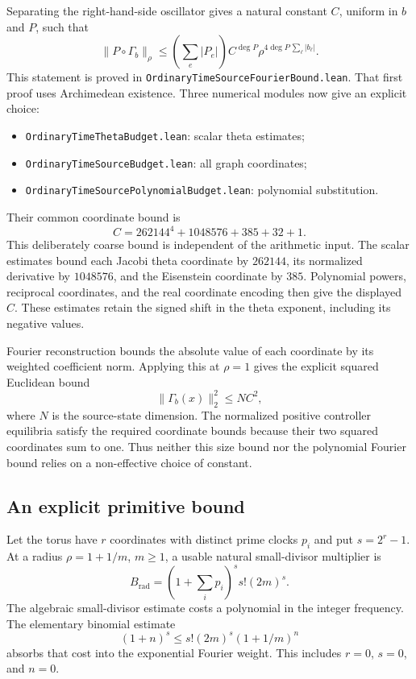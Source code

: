 \documentclass[11pt]{article}
\newcommand{\code}[1]{{\small\nolinkurl{#1}}}
\begin{document}
Separating the right-hand-side oscillator gives a natural constant $C$,
uniform in $b$ and $P$, such that
\[
 \|P\circ\Gamma_b\|_\rho
 \le \left(\sum_e |P_e|\right) C^{\deg P}
       \rho^{4\deg P\,\sum_\ell |b_\ell|}.
\]
This statement is proved in \code{OrdinaryTimeSourceFourierBound.lean}.
That first proof uses Archimedean existence. Three numerical modules now
give an explicit choice:
\begin{itemize}
\item \code{OrdinaryTimeThetaBudget.lean}: scalar theta estimates;
\item \code{OrdinaryTimeSourceBudget.lean}: all graph coordinates;
\item \code{OrdinaryTimeSourcePolynomialBudget.lean}: polynomial substitution.
\end{itemize}
Their common coordinate bound is
\[
 C=262144^4+1048576+385+32+1.
\]
This deliberately coarse bound is independent of the arithmetic input.
The scalar estimates bound each Jacobi theta coordinate by $262144$, its
normalized derivative by $1048576$, and the Eisenstein coordinate by
$385$. Polynomial powers, reciprocal coordinates, and the real coordinate
encoding then give the displayed $C$. These estimates retain the signed
shift in the theta exponent, including its negative values.

Fourier reconstruction bounds the absolute value of each coordinate by
its weighted coefficient norm. Applying this at $\rho=1$ gives the
explicit squared Euclidean bound
\[
 \|\Gamma_b(x)\|_2^2\le N C^2,
\]
where $N$ is the source-state dimension. The normalized positive
controller equilibria satisfy the required coordinate bounds because
their two squared coordinates sum to one. Thus neither this size bound
nor the polynomial Fourier bound relies on a non-effective choice of
constant.

\subsection{An explicit primitive bound}

Let the torus have $r$ coordinates with distinct prime clocks $p_i$ and
put $s=2^r-1$. At a radius $\rho=1+1/m$, $m\ge1$, a usable natural
small-divisor multiplier is
\[
 B_{\mathrm{rad}}=
 \left(1+\sum_i p_i\right)^s s!(2m)^s.
\]
The algebraic small-divisor estimate costs a polynomial in the integer
frequency. The elementary binomial estimate
\[
 (1+n)^s\le s!(2m)^s(1+1/m)^n
\]
absorbs that cost into the exponential Fourier weight. This includes
$r=0$, $s=0$, and $n=0$.
\end{document}
